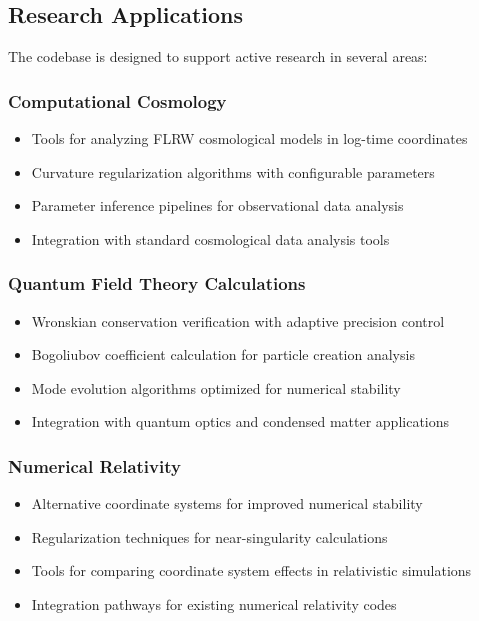 \subsection{Research Applications}
\label{subsec:research_applications}

The codebase is designed to support active research in several areas:

\subsubsection{Computational Cosmology}

\begin{itemize}
\item Tools for analyzing FLRW cosmological models in log-time coordinates
\item Curvature regularization algorithms with configurable parameters
\item Parameter inference pipelines for observational data analysis
\item Integration with standard cosmological data analysis tools
\end{itemize}

\subsubsection{Quantum Field Theory Calculations}

\begin{itemize}
\item Wronskian conservation verification with adaptive precision control
\item Bogoliubov coefficient calculation for particle creation analysis  
\item Mode evolution algorithms optimized for numerical stability
\item Integration with quantum optics and condensed matter applications
\end{itemize}

\subsubsection{Numerical Relativity}

\begin{itemize}
\item Alternative coordinate systems for improved numerical stability
\item Regularization techniques for near-singularity calculations
\item Tools for comparing coordinate system effects in relativistic simulations
\item Integration pathways for existing numerical relativity codes
\end{itemize}

